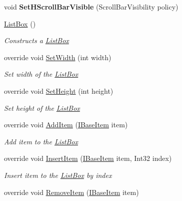 \begin{DoxyCompactItemize}
void {\bfseries Set\+H\+Scroll\+Bar\+Visible} (Scroll\+Bar\+Visibility policy)
\item 
\mbox{\hyperlink{class_space_v_i_l_1_1_list_box_a8978541c968c377b489f94685336a2da}{List\+Box}} ()
\begin{DoxyCompactList}\small\item\em Constructs a \mbox{\hyperlink{class_space_v_i_l_1_1_list_box}{List\+Box}} \end{DoxyCompactList}\item 
override void \mbox{\hyperlink{class_space_v_i_l_1_1_list_box_a6e41c4678cdfd8b1a68ed0280b50cfff}{Set\+Width}} (int width)
\begin{DoxyCompactList}\small\item\em Set width of the \mbox{\hyperlink{class_space_v_i_l_1_1_list_box}{List\+Box}} \end{DoxyCompactList}\item 
override void \mbox{\hyperlink{class_space_v_i_l_1_1_list_box_a5b44bd011e83b56053b529cf55253296}{Set\+Height}} (int height)
\begin{DoxyCompactList}\small\item\em Set height of the \mbox{\hyperlink{class_space_v_i_l_1_1_list_box}{List\+Box}} \end{DoxyCompactList}\item 
override void \mbox{\hyperlink{class_space_v_i_l_1_1_list_box_a3650d9e40035bd0d22c30b475a0a90f0}{Add\+Item}} (\mbox{\hyperlink{interface_space_v_i_l_1_1_core_1_1_i_base_item}{I\+Base\+Item}} item)
\begin{DoxyCompactList}\small\item\em Add item to the \mbox{\hyperlink{class_space_v_i_l_1_1_list_box}{List\+Box}} \end{DoxyCompactList}\item 
override void \mbox{\hyperlink{class_space_v_i_l_1_1_list_box_a3d5da8acbfd4f0bb11594b5f4b9001c0}{Insert\+Item}} (\mbox{\hyperlink{interface_space_v_i_l_1_1_core_1_1_i_base_item}{I\+Base\+Item}} item, Int32 index)
\begin{DoxyCompactList}\small\item\em Insert item to the \mbox{\hyperlink{class_space_v_i_l_1_1_list_box}{List\+Box}} by index \end{DoxyCompactList}\item 
override void \mbox{\hyperlink{class_space_v_i_l_1_1_list_box_a3fac47d275899619c3f705c24816ff87}{Remove\+Item}} (\mbox{\hyperlink{interface_space_v_i_l_1_1_core_1_1_i_base_item}{I\+Base\+Item}} item)

\end{DoxyCompactItemize}
